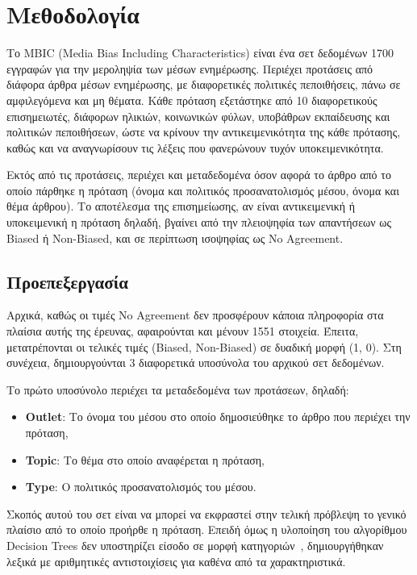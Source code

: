 \documentclass[a4paper, 12pt]{article}
\begin{document}
\section{Μεθοδολογία}


Το MBIC (Media Bias Including Characteristics) είναι ένα σετ δεδομένων 1700 εγγραφών για την μεροληψία των μέσων ενημέρωσης. Περιέχει προτάσεις από  διάφορα άρθρα μέσων ενημέρωσης, με διαφορετικές πολιτικές πεποιθήσεις, πάνω σε  αμφιλεγόμενα και μη θέματα. Κάθε πρόταση εξετάστηκε από 10 διαφορετικούς επισημειωτές, διάφορων ηλικιών, κοινωνικών φύλων, υποβάθρων εκπαίδευσης και πολιτικών πεποιθήσεων, ώστε να κρίνουν την αντικειμενικότητα της κάθε πρότασης, καθώς και να αναγνωρίσουν τις λέξεις που φανερώνουν τυχόν υποκειμενικότητα.

Εκτός από τις προτάσεις, περιέχει και μεταδεδομένα όσον αφορά το άρθρο από το οποίο πάρθηκε η πρόταση (όνομα και πολιτικός προσανατολισμός μέσου, όνομα και θέμα άρθρου). Το αποτέλεσμα της επισημείωσης, αν είναι αντικειμενική ή υποκειμενική η πρόταση δηλαδή, βγαίνει από την πλειοψηφία των απαντήσεων ως Biased ή Non-Biased, και σε περίπτωση ισοψηφίας ως No Agreement.~\cite{spinde-2021}

\subsection{Προεπεξεργασία}

Αρχικά, καθώς οι τιμές No Agreement δεν προσφέρουν κάποια πληροφορία στα πλαίσια αυτής της έρευνας, αφαιρούνται και μένουν 1551 στοιχεία. Έπειτα, μετατρέπονται οι τελικές τιμές (Biased, Non-Biased) σε δυαδική μορφή (1, 0). Στη συνέχεια, δημιουργούνται 3 διαφορετικά υποσύνολα του αρχικού σετ δεδομένων.

Το πρώτο υποσύνολο περιέχει τα μεταδεδομένα των προτάσεων, δηλαδή:
\begin{itemize}
  \item \textbf{Outlet}: Το όνομα του μέσου στο οποίο δημοσιεύθηκε το άρθρο που περιέχει την πρόταση,
  \item \textbf{Topic}: Το θέμα στο οποίο αναφέρεται η πρόταση,
  \item \textbf{Type}: Ο πολιτικός προσανατολισμός του μέσου.
\end{itemize}
Σκοπός αυτού του σετ είναι να μπορεί να εκφραστεί στην τελική πρόβλεψη το γενικό πλαίσιο από το οποίο προήρθε η πρόταση. Επειδή όμως η υλοποίηση του αλγορίθμου Decision Trees δεν υποστηρίζει είσοδο σε μορφή κατηγοριών~\cite{sklearn-dt}, δημιουργήθηκαν λεξικά με αριθμητικές αντιστοιχίσεις για καθένα από τα χαρακτηριστικά.
\end{document}
